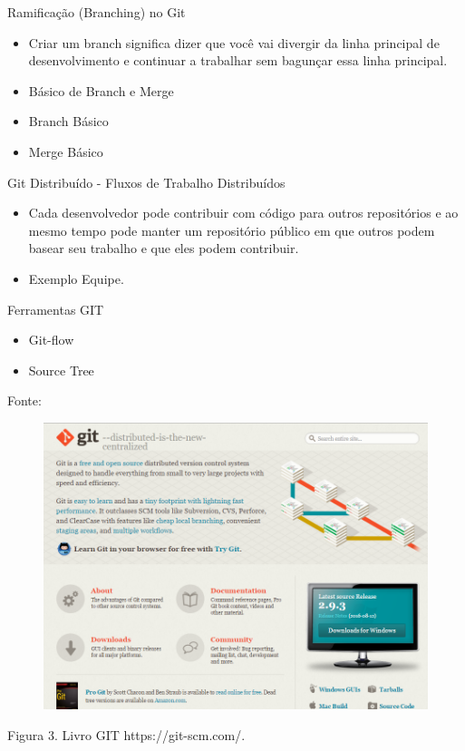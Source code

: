 \documentclass[t]{beamer}
\begin{document}
\begin{frame} {Ramificação (Branching) no Git}
	\begin{itemize}
	\item Criar um branch significa dizer que você vai divergir da linha principal de desenvolvimento e continuar a trabalhar sem bagunçar essa linha principal.
	\item Básico de Branch e Merge
	\item Branch Básico
	\item Merge Básico
	\end{itemize}
	
\end{frame}		
	
\begin{frame} {Git Distribuído - Fluxos de Trabalho Distribuídos}
	\begin{itemize}
		 \item Cada desenvolvedor pode contribuir com código para outros repositórios e ao mesmo tempo pode manter um repositório público em que outros podem basear seu trabalho e que eles podem contribuir. 
		 \item Exemplo Equipe.
	\end{itemize}
	
\end{frame}			
	
\begin{frame} {Ferramentas GIT}
	\begin{itemize}
		\item Git-flow
		\item Source Tree
	\end{itemize}	
\end{frame}		
	
	
\begin{frame} {Fonte:}
		

\begin{figure}[tb!]
	\centering
	\includegraphics[scale=0.3,keepaspectratio=true]{site.png}
\end{figure}
Figura 3. Livro GIT https://git-scm.com/.	
\end{frame}			
\end{document}

